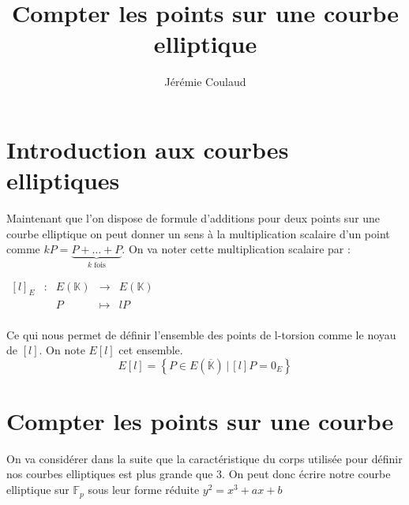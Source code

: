 \documentclass{article}
\title{Compter les points sur une courbe elliptique}
\author{Jérémie Coulaud}
\begin{document}
\newtheorem{prop}{Proposition}
\newtheorem{defi}{Définition}
\newtheorem{thm}{Théorème}
\maketitle
\newpage
\tableofcontents
\newpage

\section{Introduction aux courbes elliptiques}

Maintenant que l'on dispose de formule d'additions pour deux points sur une courbe elliptique on peut donner un sens à la multiplication scalaire d'un point comme $kP = \underbrace{P + \ldots + P}_{k \text{ fois}}$. On va noter cette multiplication scalaire par :
\newline

$\begin{array}{ccccc}
[l]_E & : & E(\mathbb{K}) & \to & E(\mathbb{K}) \\
 & & P & \mapsto & lP\\
\end{array}$

Ce qui nous permet de définir l'ensemble des points de l-torsion comme le noyau de $[l]$. On note $E[l]$ cet ensemble.
\newline
$$E[l] = \left\{ P \in E(\overline{\mathbb{K}}) \, | \, [l]P = 0_E \right\} $$

\section{Compter les points sur une courbe}
On va considérer dans la suite que la caractéristique du corps utilisée pour définir nos courbes elliptiques est plus grande que $3$. On peut donc écrire notre courbe elliptique sur $\mathbb{F}_p$ sous leur forme réduite $y^2 = x^3 + ax+b$
\end{document}
